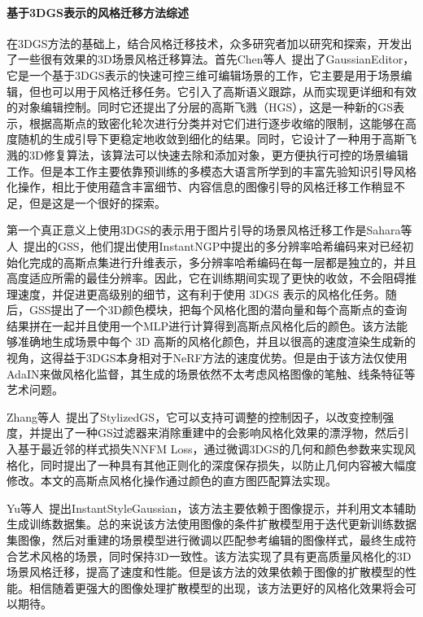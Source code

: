 \paragraph{基于3DGS表示的风格迁移方法综述}
在3DGS方法的基础上，结合风格迁移技术，众多研究者加以研究和探索，开发出了一些很有效果的3D场景风格迁移算法。首先Chen等人~\cite{chen2024gaussianeditor}提出了GaussianEditor，它是一个基于3DGS表示的快速可控三维可编辑场景的工作，它主要是用于场景编辑，但也可以用于风格迁移任务。它引入了高斯语义跟踪，从而实现更详细和有效的对象编辑控制。同时它还提出了分层的高斯飞溅（HGS），这是一种新的GS表示，根据高斯点的致密化轮次进行分类并对它们进行逐步收缩的限制，这能够在高度随机的生成引导下更稳定地收敛到细化的结果。同时，它设计了一种用于高斯飞溅的3D修复算法，该算法可以快速去除和添加对象，更方便执行可控的场景编辑工作。但是本工作主要依靠预训练的多模态大语言所学到的丰富先验知识引导风格化操作，相比于使用蕴含丰富细节、内容信息的图像引导的风格迁移工作稍显不足，但是这是一个很好的探索。

\par 第一个真正意义上使用3DGS的表示用于图片引导的场景风格迁移工作是Sahara等人~\cite{saroha2024gaussian}提出的GSS，他们提出使用InstantNGP中提出的多分辨率哈希编码来对已经初始化完成的高斯点集进行升维表示，多分辨率哈希编码在每一层都是独立的，并且高度适应所需的最佳分辨率。因此，它在训练期间实现了更快的收敛，不会阻碍推理速度，并促进更高级别的细节，这有利于使用 3DGS 表示的风格化任务。随后，GSS提出了一个3D颜色模块，把每个风格化图的潜向量和每个高斯点的查询结果拼在一起并且使用一个MLP进行计算得到高斯点风格化后的颜色。该方法能够准确地生成场景中每个 3D 高斯的风格化颜色，并且以很高的速度渲染生成新的视角，这得益于3DGS本身相对于NeRF方法的速度优势。但是由于该方法仅使用AdaIN来做风格化监督，其生成的场景依然不太考虑风格图像的笔触、线条特征等艺术问题。

\par Zhang等人~\cite{zhang2024stylizedgs}提出了StylizedGS，它可以支持可调整的控制因子，以改变控制强度，并提出了一种GS过滤器来消除重建中的会影响风格化效果的漂浮物，然后引入基于最近邻的样式损失NNFM Loss，通过微调3DGS的几何和颜色参数来实现风格化，同时提出了一种具有其他正则化的深度保存损失，以防止几何内容被大幅度修改。本文的高斯点风格化操作通过颜色的直方图匹配算法实现。

\par Yu等人~\cite{yu2024instantstylegaussian}提出InstantStyleGaussian，该方法主要依赖于图像提示，并利用文本辅助生成训练数据集。总的来说该方法使用图像的条件扩散模型用于迭代更新训练数据集图像，然后对重建的场景模型进行微调以匹配参考编辑的图像样式，最终生成符合艺术风格的场景，同时保持3D一致性。该方法实现了具有更高质量风格化的3D 场景风格迁移，提高了速度和性能。但是该方法的效果依赖于图像的扩散模型的性能。相信随着更强大的图像处理扩散模型的出现，该方法更好的风格化效果将会可以期待。

